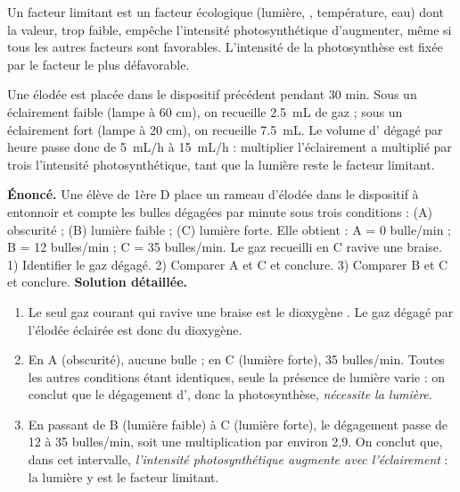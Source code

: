 \documentclass[11pt]{article}
\newcommand{\cle}[1]{{\popxbold\color{popdark}#1}}
\begin{document}
\begin{definition}
Un \cle{facteur limitant} est un facteur écologique (lumière, , température, eau) dont la valeur, trop faible, empêche l'intensité photosynthétique d'augmenter, même si tous les autres facteurs sont favorables. L'intensité de la photosynthèse est fixée par le facteur le plus défavorable.
\end{definition}

\begin{exemplebox}
Une élodée est placée dans le dispositif précédent pendant 30 min. Sous un éclairement faible (lampe à 60 cm), on recueille \SI{2,5}{mL} de gaz ; sous un éclairement fort (lampe à 20 cm), on recueille \SI{7,5}{mL}. Le volume d' dégagé par heure passe donc de \SI{5}{mL/h} à \SI{15}{mL/h} : multiplier l'éclairement a multiplié par trois l'intensité photosynthétique, tant que la lumière reste le facteur limitant.
\end{exemplebox}

\begin{exoresolu}
\textbf{Énoncé.} Une élève de 1ère D place un rameau d'élodée dans le dispositif à entonnoir et compte les bulles dégagées par minute sous trois conditions : (A) obscurité ; (B) lumière faible ; (C) lumière forte. Elle obtient : A = 0 bulle/min ; B = 12 bulles/min ; C = 35 bulles/min. Le gaz recueilli en C ravive une braise. 1) Identifier le gaz dégagé. 2) Comparer A et C et conclure. 3) Comparer B et C et conclure.
\tcblower
\textbf{Solution détaillée.}
\begin{enumerate}
\item Le seul gaz courant qui ravive une braise est le \cle{dioxygène} . Le gaz dégagé par l'élodée éclairée est donc du dioxygène.
\item En A (obscurité), aucune bulle ; en C (lumière forte), 35 bulles/min. Toutes les autres conditions étant identiques, seule la présence de lumière varie : on conclut que le dégagement d', donc la photosynthèse, \emph{nécessite la lumière}.
\item En passant de B (lumière faible) à C (lumière forte), le dégagement passe de 12 à 35 bulles/min, soit une multiplication par environ 2,9. On conclut que, dans cet intervalle, \emph{l'intensité photosynthétique augmente avec l'éclairement} : la lumière y est le facteur limitant.
\end{enumerate}
\end{exoresolu}
\end{document}
